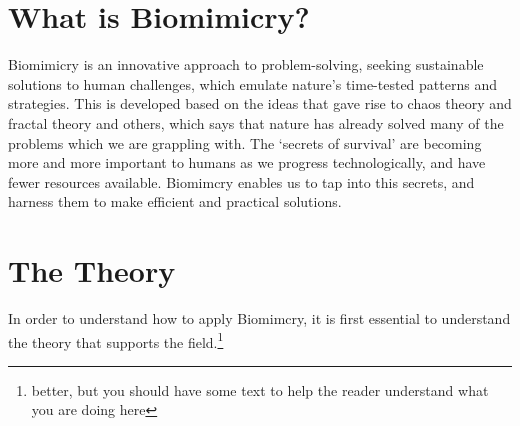 \section{What is Biomimicry?}
Biomimicry is an innovative approach to problem-solving, seeking sustainable solutions to human challenges, which emulate nature's time-tested patterns and strategies. This is developed based on the ideas that gave rise to chaos theory and fractal theory and others, which says that nature has already solved many of the problems which we are grappling with. The `secrets of survival' are becoming more and more important to humans as we progress technologically, and have fewer resources available. Biomimcry enables us to tap into this secrets, and harness them to make efficient and practical solutions.

\section{The Theory}

In order to understand how to apply Biomimcry, it is first essential to understand the theory that supports the field.\footnote{better, but you should have some text to help the reader understand what you are doing here}

